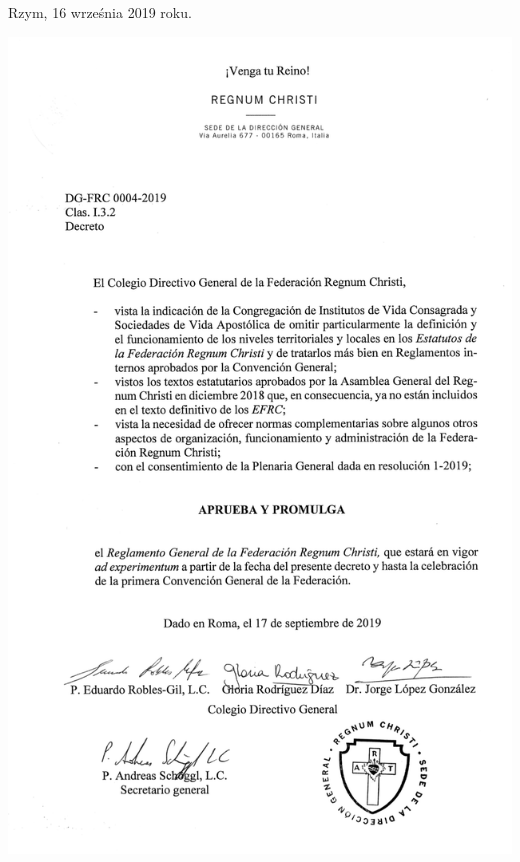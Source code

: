 Rzym, 16 września 2019 roku.
\begin{center}
	\includegraphics[height=
	\textheight]{dekret-przepisy-ogolne} 
\end{center}
